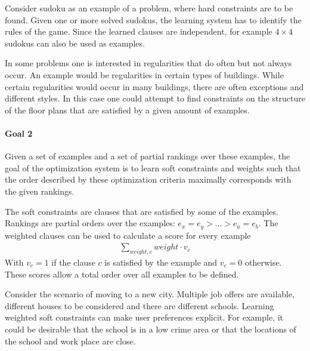 \documentclass{llncs}
\begin{document}
\begin{example}
  Consider sudoku as an example of a problem, where hard constraints are to be found.
  Given one or more solved sudokus, the learning system has to identify the rules of the game.
  Since the learned clauses are independent, for example $4 \times 4$ sudokus can also be used as examples.

  In some problems one is interested in regularities that do often but not always occur.
  An example would be regularities in certain types of buildings.
  While certain regularities would occur in many buildings, there are often exceptions and different styles.
  In this case one could attempt to find constraints on the structure of the floor plans that are satisfied by a given amount of examples.
\end{example}

\begin{framed}
  \noindent
  \begin{minipage}{\textwidth}
    \paragraph*{Goal 2}
    Given a set of examples and a set of partial rankings over these examples, the goal of the optimization system is to learn soft constraints and weights such that the order described by these optimization criteria maximally corresponds with the given rankings.
  \end{minipage}
\end{framed}

The soft constraints are clauses that are satisfied by some of the examples.
Rankings are partial orders over the examples: $e_x = e_y > ... > e_a = e_b$.
The weighted clauses can be used to calculate a score for every example
\begin{eqnarray*}
  \sum\limits_{\mathit{weight}, \mathit{c}} \mathit{weight} \cdot v_{c}
\end{eqnarray*}
With $v_c = 1$ if the clause $c$ is satisfied by the example and $v_c = 0$ otherwise.
These scores allow a total order over all examples to be defined. 

\begin{example}
  Consider the scenario of moving to a new city.
  Multiple job offers are available, different houses to be considered and there are different schools.
  Learning weighted soft constraints can make user preferences explicit.
  For example, it could be desirable that the school is in a low crime area or that the locations of the school and work place are close.
\end{example}
\end{document}
